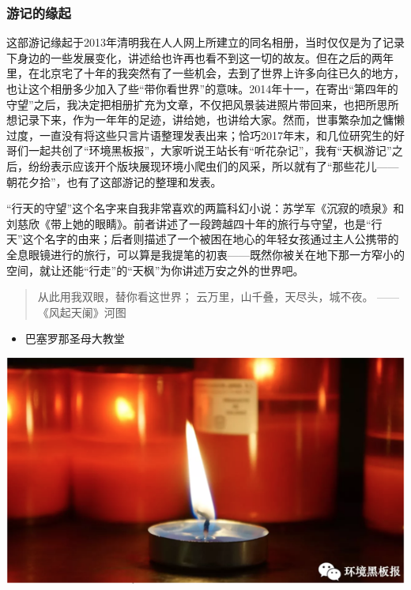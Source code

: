 \documentclass[]{book}
\providecommand{\tightlist}{%
  \setlength{\itemsep}{0pt}\setlength{\parskip}{0pt}}
\begin{document}
\subsubsection{游记的缘起}

这部游记缘起于2013年清明我在人人网上所建立的同名相册，当时仅仅是为了记录下身边的一些发展变化，讲述给也许再也看不到这一切的故友。但在之后的两年里，在北京宅了十年的我突然有了一些机会，去到了世界上许多向往已久的地方，也让这个相册多少加入了些``带你看世界''的意味。2014年十一，在寄出``第四年的守望''之后，我决定把相册扩充为文章，不仅把风景装进照片带回来，也把所思所想记录下来，作为一年年的足迹，讲给她，也讲给大家。然而，世事繁杂加之慵懒过度，一直没有将这些只言片语整理发表出来；恰巧2017年末，和几位研究生的好哥们一起共创了``环境黑板报''，大家听说王站长有``听花杂记''，我有``天枫游记''之后，纷纷表示应该开个版块展现环境小爬虫们的风采，所以就有了``那些花儿------朝花夕拾''，也有了这部游记的整理和发表。

``行天的守望''这个名字来自我非常喜欢的两篇科幻小说：苏学军《沉寂的喷泉》和刘慈欣《带上她的眼睛》。前者讲述了一段跨越四十年的旅行与守望，也是``行天''这个名字的由来；后者则描述了一个被困在地心的年轻女孩通过主人公携带的全息眼镜进行的旅行，可以算是我提笔的初衷------既然你被关在地下那一方窄小的空间，就让还能``行走''的``天枫''为你讲述万安之外的世界吧。

\begin{quote}
从此用我双眼，替你看这世界； 云万里，山千叠，天尽头，城不夜。
------《风起天阑》河图
\end{quote}

\begin{itemize}
\tightlist
\item
  巴塞罗那圣母大教堂
\end{itemize}

\includegraphics[width=8.33in]{images/xt1}
\end{document}
